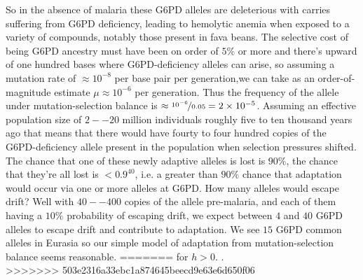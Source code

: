 So in the absence of malaria these G6PD alleles are deleterious with
carries suffering from G6PD deficiency,
leading to hemolytic anemia when exposed to a variety of compounds, notably those present in fava beans.
The selective cost of being G6PD ancestry must have been on order of
$5\%$ or more and there's upward of one hundred bases where G6PD-deficiency alleles can arise, so assuming a mutation rate of $\approx 10^{-8}$ per base pair per
generation,we can take as an order-of-magnitude estimate $\mu \approx
10^{-6}$ per generation. Thus the frequency of the allele under
mutation-selection balance is $\approx \nicefrac{10^{-6}}{0.05} =2
\times 10^{-5}$. Assuming an effective population size of $2--20$ million
individuals roughly five to ten thousand years ago that means that
there would have fourty to four hundred copies of the G6PD-deficiency
allele present in the population when selection pressures shifted. The
chance that one of these newly adaptive alleles is lost
is $90\%$, the chance that they're all lost is $<0.9^{40}$, i.e. a
greater than $90\%$ chance that adaptation would occur via one or more
alleles at G6PD. How many alleles would escape drift? Well with $40--400$
copies of the allele pre-malaria, and each of them having a $10\%$
probability of escaping drift, we expect between $4$ and $40$ G6PD
alleles to escape drift and contribute to adaptation. We see $15$ G6PD
common alleles in Eurasia so our simple model of adaptation from
mutation-selection balance seems reasonable.   
=======
for $h>0$. .\\
>>>>>>> 503e2316a33ebc1a874645beecd9e63e6d650f06


